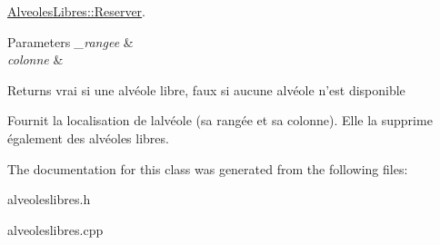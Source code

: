 \hyperlink{classAlveolesLibres_abfc3b2d308004424b8414f80b7018ee5}{Alveoles\+Libres\+::\+Reserver}. 


\begin{DoxyParams}{Parameters}
{\em \+\_\+rangee} & \\
\hline
{\em colonne} & \\
\hline
\end{DoxyParams}
\begin{DoxyReturn}{Returns}
vrai si une alvéole libre, faux si aucune alvéole n’est disponible
\end{DoxyReturn}
Fournit la localisation de l\textquotesingle{}alvéole (sa rangée et sa colonne). Elle la supprime également des alvéoles libres. 

The documentation for this class was generated from the following files\+:\begin{DoxyCompactItemize}
\item 
alveoleslibres.\+h\item 
alveoleslibres.\+cpp\end{DoxyCompactItemize}
